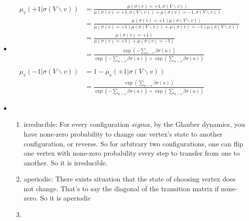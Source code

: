\documentclass[12pt]{article}
\newenvironment{solution}[2][Solution]{\begin{trivlist}
\item[\hskip \labelsep {\bfseries #1}\hskip \labelsep {\bfseries #2.}]}{\end{trivlist}}
\begin{document}
\begin{solution}{4}
    ~

    \begin{itemize}
        \item \begin{align*}
            \mu_v(+1|\sigma(V\backslash{v})) & = \frac{\mu(\sigma(v) = +1, \sigma(V\backslash{v}))}{\mu(\sigma(v) = +1, \sigma(V\backslash{v}))+\mu(\sigma(v) = -1, \sigma(V\backslash{v}))} \\
            & = \frac{\mu(\sigma(v) = +1)\mu(\sigma(V\backslash{v}))}{\mu(\sigma(v) = +1)\mu(\sigma(V\backslash{v}))+\mu(\sigma(v) = -1)\mu(\sigma(V\backslash{v}))} \\
            & = \frac{\mu(\sigma(v) = +1)}{\mu(\sigma(v) = +1)+ \mu(\sigma(v) = -1)} \\
            & = \frac{\exp(-\sum_{u \sim v}\beta\sigma(u))}{\exp(-\sum_{u\sim v}\beta\sigma(u))+\exp(\sum_{u\sim v}\beta\sigma(u))} \\
            \\
            \mu_v(-1|\sigma(V\backslash{v})) & = 1-\mu_v(+1|\sigma(V\backslash{v})) \\
            & = \frac{\exp(\sum_{u \sim v}\beta\sigma(u))}{\exp(-\sum_{u\sim v}\beta\sigma(u))+\exp(\sum_{u\sim v}\beta\sigma(u))}
        \end{align*}
        \item \begin{enumerate}
            \item irreducible: For every configuration $sigma$, by the Glauber dynamics, you have none-zero probability to change
            one vertex's state to another configuration, or reverse. So for arbitrary two configurations, one can flip one vertex with
            none-zero probability every step to transfer from one to another. So it is irreducible.
            \item aperiodic: There exists situation that the state of choosing vertex does not change. That's to say the
            diagonal of the transition matrix if none-zero. So it is aperiodic
            \item 
        \end{enumerate}
    \end{itemize}
\end{solution}
\end{document}
